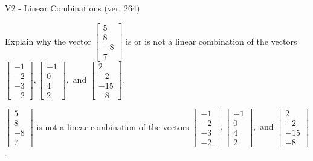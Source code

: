 \begin{exercise}
  \begin{exerciseTitle}V2 - Linear Combinations (ver. 264)\end{exerciseTitle}
  \begin{exerciseStatement}
    Explain why the vector \(\left[\begin{array}{c}
5 \\
8 \\
-8 \\
7
\end{array}\right]\)  is or is not a linear 
	combination of the vectors \(\left[\begin{array}{c}
-1 \\
-2 \\
-3 \\
-2
\end{array}\right] , \left[\begin{array}{c}
-1 \\
0 \\
4 \\
2
\end{array}\right] , \text{ and } \left[\begin{array}{c}
2 \\
-2 \\
-15 \\
-8
\end{array}\right]\).
	


  \end{exerciseStatement}
  \begin{exerciseAnswer}
   \(\left[\begin{array}{c}
5 \\
8 \\
-8 \\
7
\end{array}\right]\) 
  	 is not  
	a linear combination of the vectors \(\left[\begin{array}{c}
-1 \\
-2 \\
-3 \\
-2
\end{array}\right] , \left[\begin{array}{c}
-1 \\
0 \\
4 \\
2
\end{array}\right] , \text{ and } \left[\begin{array}{c}
2 \\
-2 \\
-15 \\
-8
\end{array}\right]\).

	
  


  \end{exerciseAnswer}
\end{exercise}